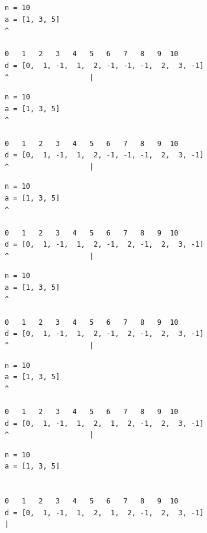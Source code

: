 \begin{frame}[fragile]
\begin{verbatim}
n = 10
a = [1, 3, 5]
^

0   1   2   3   4   5   6   7   8   9  10
d = [0,  1, -1,  1,  2, -1, -1, -1,  2,  3, -1]
^                   |
\end{verbatim}
\end{frame}
\addtocounter{framenumber}{-1}

\begin{frame}[fragile]
\begin{verbatim}
n = 10
a = [1, 3, 5]
^

0   1   2   3   4   5   6   7   8   9  10
d = [0,  1, -1,  1,  2, -1, -1, -1,  2,  3, -1]
^                   |
\end{verbatim}
\end{frame}
\addtocounter{framenumber}{-1}

\begin{frame}[fragile]
\begin{verbatim}
n = 10
a = [1, 3, 5]
^

0   1   2   3   4   5   6   7   8   9  10
d = [0,  1, -1,  1,  2, -1,  2, -1,  2,  3, -1]
^                   |
\end{verbatim}
\end{frame}
\addtocounter{framenumber}{-1}

\begin{frame}[fragile]
\begin{verbatim}
n = 10
a = [1, 3, 5]
^

0   1   2   3   4   5   6   7   8   9  10
d = [0,  1, -1,  1,  2, -1,  2, -1,  2,  3, -1]
^                   |
\end{verbatim}
\end{frame}
\addtocounter{framenumber}{-1}

\begin{frame}[fragile]
\begin{verbatim}
n = 10
a = [1, 3, 5]
^

0   1   2   3   4   5   6   7   8   9  10
d = [0,  1, -1,  1,  2,  1,  2, -1,  2,  3, -1]
^                   |
\end{verbatim}
\end{frame}
\addtocounter{framenumber}{-1}

\begin{frame}[fragile]
\begin{verbatim}
n = 10
a = [1, 3, 5]


0   1   2   3   4   5   6   7   8   9  10
d = [0,  1, -1,  1,  2,  1,  2, -1,  2,  3, -1]
|
\end{verbatim}
\end{frame}

